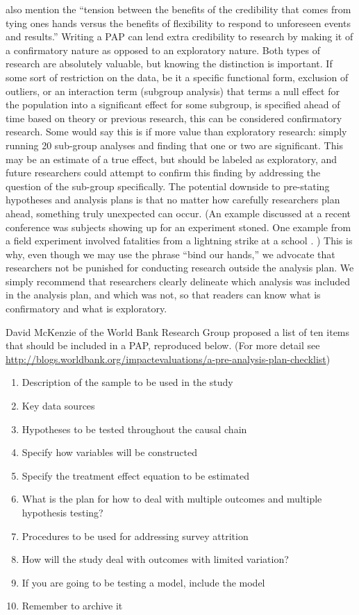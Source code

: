 \documentclass[12pt] {article}
\begin{document}
\cite{glennerster_running_2013} also mention the ``tension between
the benefits of the credibility that comes from tying ones hands versus
the benefits of flexibility to respond to unforeseen events and
results.'' Writing a PAP can lend extra credibility to research by making it of a confirmatory nature as opposed to an exploratory nature.
Both types of research are absolutely valuable, but knowing the distinction is important. If some sort of restriction on the data, be it a specific functional form, exclusion of outliers, or an interaction term (subgroup analysis) that terms a null effect for the population into a significant effect for some subgroup, is specified ahead of time based on theory or previous research, this can be considered confirmatory research. Some would say this is if more value than exploratory research: simply running 20 sub-group analyses and finding that one or two are significant. This may be an estimate of a true effect, but should be labeled as exploratory, and future researchers could attempt to confirm this finding by addressing the question of the sub-group specifically. The potential downside to pre-stating hypotheses and analysis plans is that no matter how carefully researchers plan ahead, something truly unexpected can occur. (An example discussed at a recent conference was subjects showing up for an experiment stoned. One example from a field experiment involved fatalities from a lightning strike at a school \citep{kremer2009incentives}. ) This is why, even though we may use the phrase ``bind our hands,'' we advocate that researchers not be punished for conducting research outside the analysis plan. We simply recommend that researchers clearly delineate which analysis was included in the analysis plan, and which was not, so that readers can know what is confirmatory and what is exploratory.


David McKenzie of the World Bank Research Group proposed a list of ten
items that should be included in a PAP, reproduced below. (For more
detail see
\url{http://blogs.worldbank.org/impactevaluations/a-pre-analysis-plan-checklist})

\begin{enumerate}
\item
  Description of the sample to be used in the study
\item
  Key data sources
\item
  Hypotheses to be tested throughout the causal chain
\item
  Specify how variables will be constructed
\item
  Specify the treatment effect equation to be estimated
\item
  What is the plan for how to deal with multiple outcomes and multiple
  hypothesis testing?
\item
  Procedures to be used for addressing survey attrition
\item
  How will the study deal with outcomes with limited variation?
\item
  If you are going to be testing a model, include the model
\item
  Remember to archive it
\end{enumerate}
\end{document}

